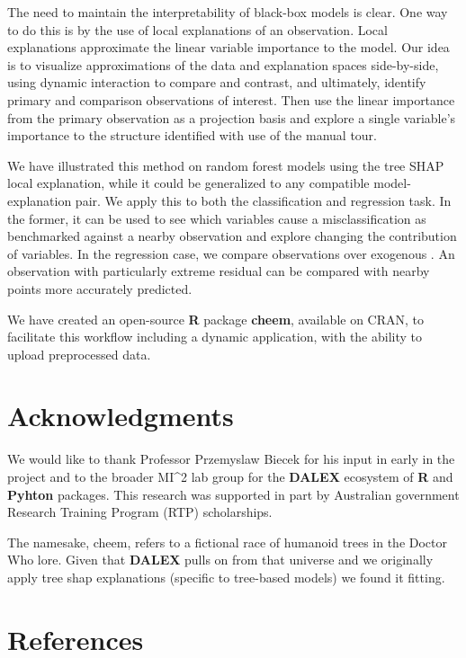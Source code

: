\documentclass[
]{article}
\begin{document}
The need to maintain the interpretability of black-box models is clear. One way to do this is by the use of local explanations of an observation. Local explanations approximate the linear variable importance to the model. Our idea is to visualize approximations of the data and explanation spaces side-by-side, using dynamic interaction to compare and contrast, and ultimately, identify primary and comparison observations of interest. Then use the linear importance from the primary observation as a projection basis and explore a single variable's importance to the structure identified with use of the manual tour.

We have illustrated this method on random forest models using the tree SHAP local explanation, while it could be generalized to any compatible model-explanation pair. We apply this to both the classification and regression task. In the former, it can be used to see which variables cause a misclassification as benchmarked against a nearby observation and explore changing the contribution of variables. In the regression case, we compare observations over exogenous . An observation with particularly extreme residual can be compared with nearby points more accurately predicted.

We have created an open-source \textbf{R} package \textbf{cheem}, available on CRAN, to facilitate this workflow including a dynamic application, with the ability to upload preprocessed data.

\hypertarget{acknowledgments}{%
\section{Acknowledgments}\label{acknowledgments}}

We would like to thank Professor Przemyslaw Biecek for his input in early in the project and to the broader MI\^{}2 lab group for the \textbf{DALEX} ecosystem of \textbf{R} and \textbf{Pyhton} packages. This research was supported in part by Australian government Research Training Program (RTP) scholarships.

The namesake, cheem, refers to a fictional race of humanoid trees in the Doctor Who lore. Given that \textbf{DALEX} pulls on from that universe and we originally apply tree shap explanations (specific to tree-based models) we found it fitting.

\hypertarget{references}{%
\section*{References}\label{references}}
\end{document}
